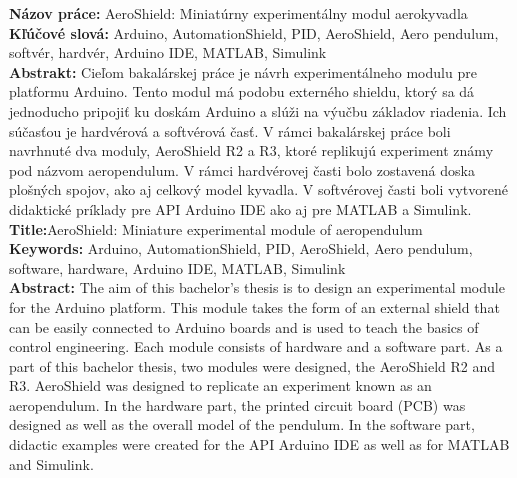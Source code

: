 \noindent
\textbf{Názov práce:} AeroShield: Miniatúrny experimentálny modul aerokyvadla\\
\textbf{Kľúčové slová: } Arduino, AutomationShield, PID, AeroShield, Aero pendulum, softvér, hardvér, Arduino IDE, MATLAB, Simulink \\
\textbf{Abstrakt: } Cieľom bakalárskej práce je návrh experimentálneho modulu pre platformu Arduino. Tento modul má podobu externého shieldu, ktorý sa dá jednoducho pripojiť ku doskám Arduino a slúži na výučbu základov riadenia. Ich súčasťou je hardvérová a softvérová časť. V rámci bakalárskej práce boli navrhnuté dva moduly, AeroShield R2 a R3, ktoré replikujú experiment známy pod názvom aeropendulum. V rámci hardvérovej časti bolo zostavená doska plošných spojov, ako aj celkový model kyvadla. V softvérovej časti boli vytvorené didaktické príklady pre API Arduino IDE ako aj pre MATLAB a Simulink.\\

\noindent
\textbf{Title:}AeroShield: Miniature experimental module of aeropendulum \\
\textbf{Keywords: }  Arduino, AutomationShield, PID, AeroShield, Aero pendulum, software, hardware, Arduino IDE, MATLAB, Simulink\\
\textbf{Abstract: } The aim of this bachelor's thesis is to design an experimental module for the Arduino platform. This module takes the form of an external shield that can be easily connected to Arduino boards and is used to teach the basics of control engineering. Each module consists of hardware and a software part. As a part of this bachelor thesis, two modules were designed, the AeroShield R2 and R3. AeroShield was designed to replicate an experiment known as an aeropendulum. In the hardware part, the printed circuit board (PCB) was designed as well as the overall model of the pendulum. In the software part, didactic examples were created for the API Arduino IDE as well as for MATLAB and Simulink.
\cleardoublepage
